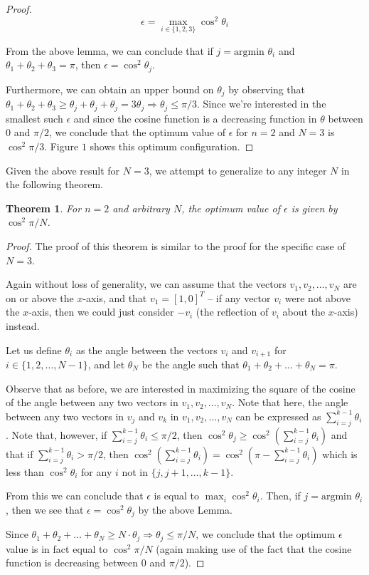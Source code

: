 \documentclass[11pt,letterpaper,twoside,english]{article}
\theoremstyle{theorem}
\newtheorem{theorem}{Theorem}[section]
\theoremstyle{remark}
\begin{document}
\begin{proof}
$$\epsilon = \max_{i \in \{1,2,3\}} \cos ^2 \theta_i$$

From the above lemma, we can conclude that if $j = \text{argmin } \theta_i$ and $\theta_1 + \theta_2 + \theta_3 = \pi$, then $\epsilon = \cos^2 \theta_j$.

Furthermore, we can obtain an upper bound on $\theta_j$ by observing that $\theta_ 1 + \theta_ 2 + \theta_3 \geq \theta_ j + \theta_j + \theta_j = 3 \theta_j \Rightarrow \theta_j \leq \pi/3$. Since we're interested in the smallest such $\epsilon$ and since the cosine function is a decreasing function in $\theta$ between $0$ and $\pi/2$, we conclude that the optimum value of $\epsilon$ for $n=2$ and $N=3$ is $\cos^2 \pi / 3$. Figure $1$ shows this optimum configuration.

\end{proof}

Given the above result for $N=3$, we attempt to generalize to any integer $N$ in the following theorem.

\begin{theorem}
For $n=2$ and arbitrary $N$, the optimum value of $\epsilon$ is given by $\cos^2 \pi/N$.
\end{theorem}

\begin{proof}
The proof of this theorem is similar to the proof for the specific case of $N=3$.

Again without loss of generality, we can assume that the vectors $v_1, v_2, \ldots, v_N$ are on or above the $x$-axis, and that $v_1 = [1,0]^T$ -- if any vector $v_i$ were not above the $x$-axis, then we could just consider $-v_i$ (the reflection of $v_i$ about the $x$-axis) instead.

Let us define $\theta_i$ as the angle between the vectors $v_i$ and $v_{i+1}$ for $i \in \{1, 2, \ldots, N-1\}$, and let $\theta_N$ be the angle such that $\theta_1 + \theta_2 + \ldots + \theta_N = \pi$.

Observe that as before, we are interested in maximizing the square of the cosine of the angle between any two vectors in $v_1, v_2, \ldots, v_N$. Note that here, the angle between any two vectors in $v_j$ and $v_k$ in $v_1, v_2, \ldots, v_N$ can be expressed as $\sum_{i=j} ^{k-1} \theta_i$. Note that, however, if $\sum_{i=j}^{k-1} \theta_i \leq \pi/2$, then $\cos^2 \theta_j \geq \cos^2(\sum_{i=j}^{k-1} \theta_i)$ and that if $\sum_{i=j}^{k-1} \theta_i > \pi/2$, then $\cos^2 (\sum_{i=j}^{k-1} \theta_i) = \cos^2 (\pi - \sum_{i=j}^{k-1} \theta_i)$ which is less than $\cos^2 \theta_i$ for any $i$ not in $\{j, j+1, \ldots, k-1\}$.

From this we can conclude that $\epsilon$ is equal to $\max_i \cos^2 \theta_i$. Then, if $j = \text{argmin } \theta_i$, then we see that $\epsilon = \cos^2 \theta_j$ by the above Lemma.

Since $\theta_ 1 + \theta_2 + \ldots + \theta_N \geq N \cdot \theta_j \Rightarrow \theta_j \leq \pi/N$, we conclude that the optimum $\epsilon$ value is in fact equal to $\cos^2 \pi/N$ (again making use of the fact that the cosine function is decreasing between $0$ and $\pi/2$).
\end{proof}
\end{document}
